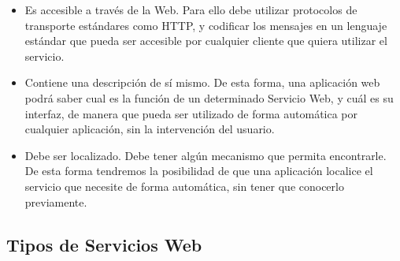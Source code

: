\begin{itemize}
	\item Es accesible a través de la Web. Para ello debe utilizar protocolos de transporte estándares como HTTP, y codificar los mensajes en un lenguaje estándar que pueda ser accesible por cualquier cliente que quiera utilizar el servicio. 
	
	\item Contiene una descripción de sí mismo. De esta forma, una aplicación web podrá saber cual es la función de un determinado Servicio Web, y cuál es su interfaz, de manera que pueda ser utilizado de forma automática por cualquier aplicación, sin la intervención del usuario.
	
	\item Debe ser localizado. Debe tener algún mecanismo que permita encontrarle. De esta forma tendremos la posibilidad de que una aplicación localice el servicio que necesite de forma automática, sin tener que conocerlo previamente.
\end{itemize}

\subsection{Tipos de Servicios Web}
\label{cap:subsec:tiposserviciosweb}

